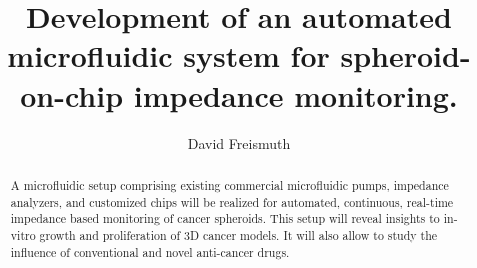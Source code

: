 \documentclass{report}
\title{Development of an automated microfluidic system for spheroid-on-chip impedance monitoring.}
\author{David Freismuth}
\begin{document}
\maketitle
\tableofcontents

\begin{abstract}
A microfluidic setup comprising existing commercial microfluidic pumps, impedance analyzers, and customized chips will be realized for automated, continuous, real-time impedance based monitoring of cancer spheroids. This setup will reveal insights to in-vitro growth and proliferation of 3D cancer models. It will also allow to study the influence of conventional and novel anti-cancer drugs.
\end{abstract}









\end{document}
